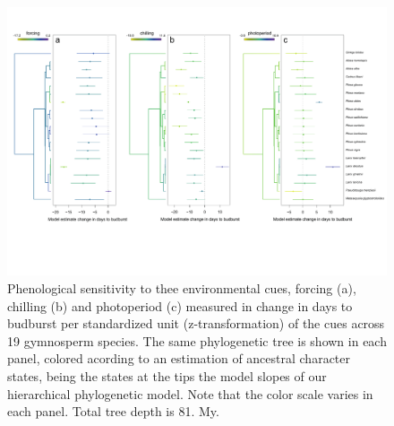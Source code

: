 \documentclass{article}\usepackage[]{graphicx}\usepackage[]{color}
\begin{document}
\begin{figure} [H]
  \begin{center}
  \includegraphics[width=16cm]{../../analyses/phylogeny/figures/Fig1b_phylo_muplots_gymno.pdf}
  \caption{Phenological sensitivity to thee environmental cues, forcing (a), chilling (b) and photoperiod (c) measured in change in days to budburst per standardized unit (z-transformation) of the cues across 19 gymnosperm species. The same phylogenetic tree is shown in each panel, colored acording to an estimation of ancestral character states, being the states at the tips the model slopes of our hierarchical phylogenetic model. Note that the color scale varies in each panel. Total tree depth is 81. My.}
  \label{fig:muplot_allgymno}
  \end{center}
\end{figure}
\end{document}
